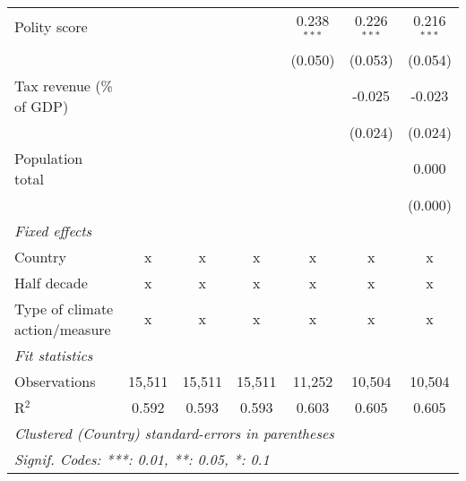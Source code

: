 \begin{tabular}{lcccccc}
   Polity score                                                              &         &                &                & 0.238$^{***}$  & 0.226$^{***}$  & 0.216$^{***}$\\   
                                                                             &         &                &                & (0.050)        & (0.053)        & (0.054)\\   
   Tax revenue (\% of GDP)                                                   &         &                &                &                & -0.025         & -0.023\\   
                                                                             &         &                &                &                & (0.024)        & (0.024)\\   
   Population total                                                          &         &                &                &                &                & 0.000\\   
                                                                             &         &                &                &                &                & (0.000)\\   
   \emph{Fixed effects}\\
   Country                                                                   & x       & x              & x              & x              & x              & x\\  
   Half decade                                                               & x       & x              & x              & x              & x              & x\\  
   Type of climate action/measure                                            & x       & x              & x              & x              & x              & x\\  
   \midrule \emph{Fit statistics}\\
   Observations                                                              & 15,511  & 15,511         & 15,511         & 11,252         & 10,504         & 10,504\\  
   R$^2$                                                                     & 0.592   & 0.593          & 0.593          & 0.603          & 0.605          & 0.605\\  
   \midrule
   \multicolumn{7}{l}{\emph{Clustered (Country) standard-errors in parentheses}}\\
   \multicolumn{7}{l}{\emph{Signif. Codes: ***: 0.01, **: 0.05, *: 0.1}}\\
\end{tabular}
\par\endgroup


